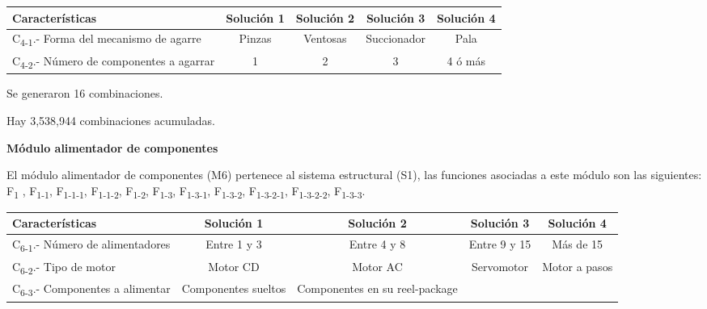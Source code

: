 \begin{center}
\begin{adjustbox}{angle=90}
\begin{tabular}{|l|c|c|c|c|}
\hline
\textbf{Caracter\'isticas} &
 \textbf{Soluci\'on 1} &
 \textbf{Soluci\'on 2} &
 \textbf{Soluci\'on 3} &
 \textbf{Soluci\'on 4}\\\hline
C\textsubscript{4-1}.- Forma del mecanismo de agarre &
 Pinzas &
 Ventosas &
 Succionador &
 Pala\\\hline
C\textsubscript{4-2}.- N\'umero de componentes a agarrar &
 1 &
 2 &
 3 &
 4 \'o m\'as\\\hline
\end{tabular}

\end{adjustbox}
\end{center}

Se generaron 16 combinaciones.\par
\par Hay 3,538,944 combinaciones acumuladas.

\textbf{M\'odulo alimentador de componentes}

El m\'odulo alimentador de componentes (M6) pertenece al sistema estructural (S1), las funciones asociadas a este m\'odulo son las siguientes: F\textsubscript{1}
, F\textsubscript{1-1}, F\textsubscript{1-1-1}, F\textsubscript{1-1-2}, F\textsubscript{1-2}, F\textsubscript{1-3}, F\textsubscript{1-3-1}, F\textsubscript{1-3-2}, F\textsubscript{1-3-2-1}, F\textsubscript{1-3-2-2}, F\textsubscript{1-3-3}.


\begin{center}
\begin{adjustbox}{angle=90}
\begin{tabular}{|l|c|c|c|c|}
\hline
\textbf{Caracter\'isticas} &
 \textbf{Soluci\'on 1} &
 \textbf{Soluci\'on 2} &
 \textbf{Soluci\'on 3} &
 \textbf{Soluci\'on 4}\\\hline
C\textsubscript{6-1}.- N\'umero de alimentadores &
 Entre 1 y 3 &
 Entre 4 y 8 &
 Entre 9 y 15 &
 M\'as de 15\\\hline
C\textsubscript{6-2}.- Tipo de motor &
 Motor CD &
 Motor AC &
 Servomotor &
 Motor a pasos\\\hline
C\textsubscript{6-3}.- Componentes a alimentar &
 Componentes sueltos &
 Componentes en su reel-package &
   &
 \\\hline
\end{tabular}

\end{adjustbox}
\end{center}


